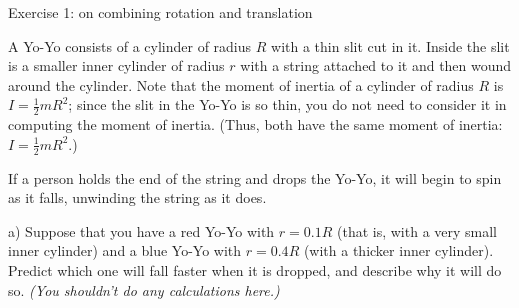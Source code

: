 \documentclass[12pt]{article}
\begin{document}
\Large
\centerline{}
\normalsize
\centerline{}

\begin{center}
	\Large Exercise 1: on combining rotation and translation
\end{center}

\begin{minipage}{0.6\textwidth}
A Yo-Yo consists of a cylinder of radius $R$ with a thin slit cut in it. Inside the slit is a smaller inner cylinder of radius $r$ with a string attached to it and then wound around the cylinder. Note that the moment of inertia of a cylinder of radius $R$ is $I=\frac{1}{2}mR^2$; since the slit in the Yo-Yo is so thin, you do not need to consider it in computing the moment of inertia. (Thus, both have the same moment of inertia: $I=\frac{1}{2}mR^2$.)

If a person holds the end of the string and drops the Yo-Yo, it will begin to spin as it falls, unwinding the string as it does. 

\bigskip\bigskip

a) Suppose that you have a red Yo-Yo with $r=0.1 R$ (that is, with a very small inner cylinder) and a blue Yo-Yo with $r=0.4 R$ (with a thicker inner cylinder). Predict which one will fall faster when it is dropped, and describe why it will do so. \textit{(You shouldn't do any calculations here.)}
\end{minipage}
\end{document}

